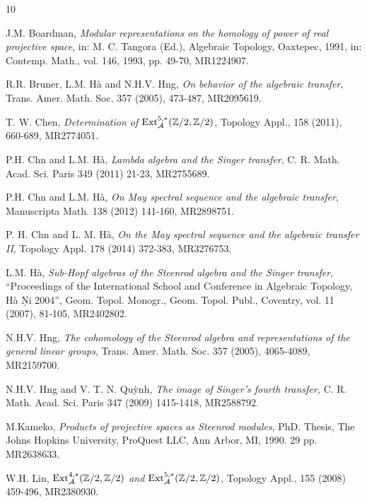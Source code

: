 \documentclass[reqno]{amsart}
\theoremstyle{plain}
\theoremstyle{definition}
\theoremstyle{plain}
\theoremstyle{definition}
\numberwithin{equation}{section}
\begin{document}
\medskip
\begin{thebibliography}{10}

 J.M. Boardman, \textit{Modular representations on the homology of power of real projective space}, in: M. C. Tangora (Ed.),  Algebraic Topology, Oaxtepec, 1991,  in: Contemp. Math., vol. 146, 1993, pp. 49-70,  MR1224907. 

 R.R. Bruner, L.M. H\`a and N.H.V. H\uhorn ng, \textit{On behavior of the algebraic transfer}, Trans. Amer. Math. Soc.  357 (2005), 473-487, MR2095619. 

  T. W. Chen, \textit{Determination of  $\mbox{\rm Ext}_{\mathcal A}^{5,*}(\mathbb Z/2,\mathbb Z/2)$}, Topology Appl., 158  (2011), 660-689,   MR2774051. 

  P.H. Ch\ohorn n and L.M. H\`a, \textit{Lambda algebra and the Singer transfer}, C. R. Math. Acad. Sci. Paris 349 (2011) 21-23, MR2755689.  

 P.H. Ch\ohorn n and L.M. H\`a, \textit{On May spectral sequence and the algebraic transfer}, Manuscripta Math. 138 (2012) 141-160, MR2898751.

 P. H. Ch\ohorn n and L. M. H\`a, \textit{On the May spectral sequence and the algebraic transfer II}, Topology Appl. 178 (2014) 372-383, MR3276753.

  L.M. H\`a, \textit{Sub-Hopf algebras of the Steenrod algebra and the Singer transfer}, ``Proceedings of the International School and Conference in Algebraic Topology, H\`a N\d\ocircumflex i   2004'', Geom. Topol. Monogr., Geom. Topol. Publ., Coventry, vol. 11 (2007), 81-105,  MR2402802.

   N.H.V. H\uhorn ng, \textit{The cohomology of the Steenrod algebra and representations of the general linear groups}, Trans. Amer. Math. Soc.  357 (2005), 4065-4089, MR2159700. 

 N.H.V. H\uhorn ng and V. T. N. Qu\`ynh, \textit{The image of Singer's fourth transfer,} C. R. Math. Acad. Sci. Paris  347  (2009) 1415-1418, MR2588792.

  M.Kameko, \textit{Products of projective spaces as Steenrod modules}, PhD. Thesis, The Johns Hopkins University, ProQuest LLC, Ann Arbor, MI, 1990. 29 pp. MR2638633. 

  W.H. Lin, \textit{$\mbox{\rm Ext}_{\mathcal A}^{4,*}(\mathbb Z/2,\mathbb Z/2)$ and $\mbox{\rm Ext}_{\mathcal A}^{5,*}(\mathbb Z/2,\mathbb Z/2)$}, Topology Appl., 155  (2008) 459-496,  MR2380930. 


\end{thebibliography}
\end{document}
